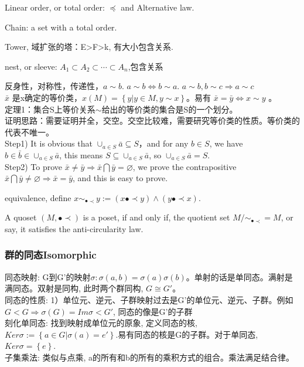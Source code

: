 \documentclass[UTF8]{../../09-Mathematics}
\begin{document}
\begin{proposition}
  Linear order, or total order: $\preceq$ and Alternative law.

  Chain: a set with a total order.

  Tower, 域扩张的塔：E>F>k, 有大小包含关系.

  nest, or sleeve: $A_1 \subset A_2 \subset \cdots  \subset A_n$,包含关系
\end{proposition}

反身性，对称性，传递性，$a \sim b$. $a \sim b \Leftrightarrow b \sim a$. $a \sim b , b \sim c \Rightarrow a \sim c$\\
$\bar x$ 是x确定的等价类，$x(M) = \left\{ y | y \in M, y \sim x \right\}$。易有
$\bar x = \bar y \Leftrightarrow x \sim y$ 。\\


定理1：集合S上等价关系$\sim$给出的等价类的集合是S的一个划分。\\
证明思路：需要证明并全，交空。交空比较难，需要研究等价类的性质。等价类的代表不唯一。\\
Step1)  It is obvious that $\cup _{a \in S} {\bar a} \subseteq S$，and for any $b \in S$, we have $b \in \bar b \in \cup _{a \in S} {\bar a}$, this means $S \subseteq \cup _{a \in S} {\bar a}  $, so $ \cup _{a \in S} {\bar a} =S $.\\
Step2) To prove $\bar x \neq \bar y \Rightarrow \bar x \bigcap \bar y = \varnothing  $, we prove the contrapositive $ \bar x \bigcap \bar y \neq \varnothing \Rightarrow  \bar x = \bar y$, and this is easy to prove.\\


\begin{proposition}
  equivalence, define $x\sim _{\bullet \prec } y:= (x \bullet \prec y) \wedge (y \bullet \prec x)$.
\end{proposition}

\begin{proposition}
  A quoset $(M, \bullet \prec)$ is a poset, if and only if, the quotient set $M / \sim _{\bullet \prec} =  M$, or say, it satisfies the anti-circularity law.
\end{proposition}


\subsubsection{群的同态Isomorphic}
同态映射: G到G'的映射$\sigma: \sigma(a,b)=\sigma(a) \sigma(b)$。单射的话是单同态。满射是满同态。双射是同构, 此时两个群同构, $G \cong G'$。\\
同态的性质: 1）单位元、逆元、子群映射过去是G’的单位元、逆元、子群。例如$G<G \Rightarrow \sigma(G)=Im\sigma <G'$, 同态的像是G'的子群\\
刻化单同态: 找到映射成单位元的原象, 定义同态的核, $Ker\sigma:=\left\{ a \in G | \sigma(a)=e' \right\}$.易有同态的核是G的子群。对于单同态, $Ker\sigma=\left\{ e \right\}$.\\
子集乘法: 类似与点乘, a的所有和b的所有的乘积方式的组合。乘法满足结合律。\\
\end{document}
